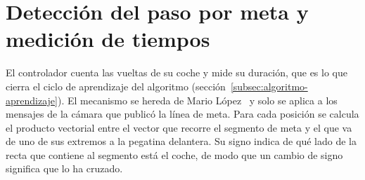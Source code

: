 %
%
%
%
%
%

\section{Detección del paso por meta y medición de tiempos}
\label{subsec:control-meta}

El controlador cuenta las vueltas de su coche y mide su duración, que es lo que cierra el ciclo de aprendizaje del algoritmo (sección~\ref{subsec:algoritmo-aprendizaje}). 
El mecanismo se hereda de Mario López~\cite{tfgmario} y solo se aplica a los mensajes de la cámara que publicó la línea de meta. Para cada posición se calcula el producto vectorial entre el vector que recorre el segmento de meta y el que va de uno de sus extremos a la pegatina delantera. Su signo indica de qué lado de la recta que contiene al segmento está el coche, de modo que un cambio de signo significa que lo ha cruzado.

